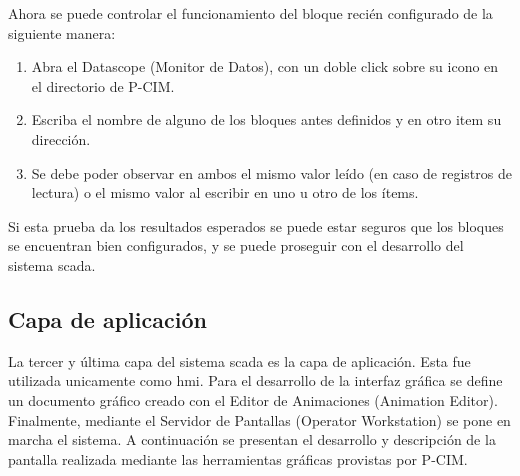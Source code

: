 Ahora se puede controlar el funcionamiento del bloque recién configurado de la 
siguiente manera:
\begin{enumerate}
  \item Abra el Datascope (Monitor de Datos), con un doble click sobre su icono 
  en el directorio de P-CIM.
  \item Escriba el nombre de alguno de los bloques antes definidos  y en otro 
  item su dirección.
  \item Se debe poder observar en ambos el mismo valor leído (en caso de
  registros de lectura) o el mismo valor al escribir en uno u otro de los ítems.
\end{enumerate}
Si esta prueba da los resultados esperados se puede estar seguros que
los bloques se encuentran bien configurados, y se puede proseguir con el
desarrollo del sistema \gls{scada}.

\subsection{Capa de aplicación}
\label{subsec:CapaAplicacion}

La tercer y última capa del sistema \gls{scada} es la capa de aplicación. Esta
fue utilizada unicamente como \gls{hmi}. Para el
desarrollo de la interfaz gráfica se define un documento gráfico creado con el
Editor de Animaciones (Animation Editor). Finalmente, mediante el Servidor de 
Pantallas (Operator Workstation) se pone en marcha el sistema. A continuación se 
presentan el desarrollo y descripción de la pantalla realizada mediante las 
herramientas gráficas provistas por P-CIM.



